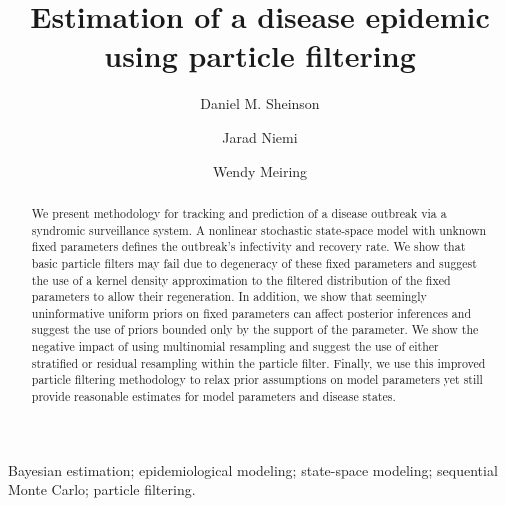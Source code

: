 \documentclass{elsarticle}
\begin{document}
\begin{frontmatter}

\title{Estimation of a disease epidemic using particle filtering}

\author[danny]{Daniel M. Sheinson}
\author[jarad]{Jarad Niemi}
\author[wendy]{Wendy Meiring}

\address[danny]{Corresponding author -- Department of Statistics and Applied Probability, University of California--Santa Barbara, \\ Santa Barbara, CA 93106, U.S.A., sheinson@pstat.ucsb.edu, 1-847-609-7824}
\address[jarad]{Department of Statistics, Iowa State University, Ames, IA 50011, U.S.A., niemi@iastate.edu}
\address[wendy]{Department of Statistics and Applied Probability, University of California--Santa Barbara, \\ Santa Barbara, CA 93106, U.S.A., meiring@pstat.ucsb.edu}

\begin{abstract}
We present methodology for tracking and prediction of a disease outbreak via a syndromic surveillance system. A nonlinear stochastic state-space model with unknown fixed parameters defines the outbreak's infectivity and recovery rate. We show that basic particle filters may fail due to degeneracy of these fixed parameters and suggest the use of a kernel density approximation to the filtered distribution of the fixed parameters to allow their regeneration. In addition, we show that seemingly uninformative uniform priors on fixed parameters can affect posterior inferences and suggest the use of priors bounded only by the support of the parameter. We show the negative impact of using multinomial resampling and suggest the use of either stratified or residual resampling within the particle filter. Finally, we use this improved particle filtering methodology to relax prior assumptions on model parameters yet still provide reasonable estimates for model parameters and disease states.
\end{abstract}

\begin{keyword}
Bayesian estimation; epidemiological modeling; state-space modeling; sequential Monte Carlo; particle filtering.
\end{keyword}

\end{frontmatter}

\let\thefootnote\relax{}
\end{document}
